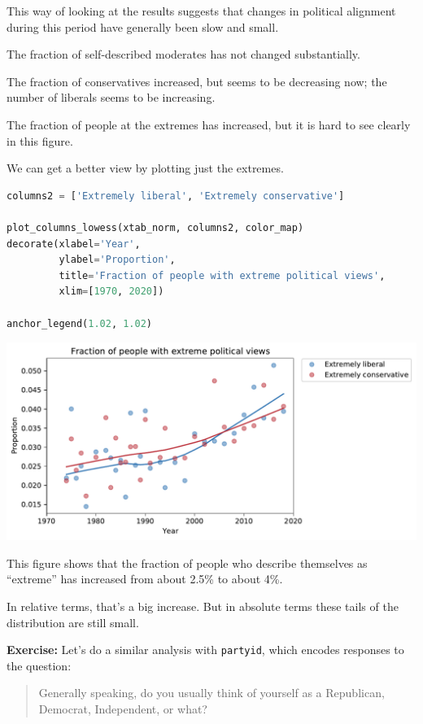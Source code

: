 This way of looking at the results suggests that changes in political
alignment during this period have generally been slow and small.

The fraction of self-described moderates has not changed substantially.

The fraction of conservatives increased, but seems to be decreasing now;
the number of liberals seems to be increasing.

The fraction of people at the extremes has increased, but it is hard to
see clearly in this figure.

We can get a better view by plotting just the extremes.

\begin{lstlisting}[language=Python,style=source]
columns2 = ['Extremely liberal', 'Extremely conservative']

plot_columns_lowess(xtab_norm, columns2, color_map)
decorate(xlabel='Year',
         ylabel='Proportion',
         title='Fraction of people with extreme political views',
         xlim=[1970, 2020])

anchor_legend(1.02, 1.02)
\end{lstlisting}

\begin{center}
\includegraphics[scale=0.75]{02_polviews_files/02_polviews_89_0.pdf}
\end{center}

This figure shows that the fraction of people who describe themselves as
``extreme'' has increased from about 2.5\% to about 4\%.

In relative terms, that's a big increase. But in absolute terms these
tails of the distribution are still small.

\textbf{Exercise:} Let's do a similar analysis with
\passthrough{\lstinline!partyid!}, which encodes responses to the
question:

\begin{quote}
Generally speaking, do you usually think of yourself as a Republican,
Democrat, Independent, or what?
\end{quote}


